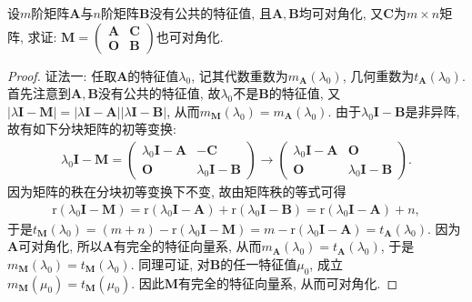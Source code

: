 \documentclass[../../main.tex]{subfiles}%
\begin{document}
\begin{proposition}\label{proposition:没有公共的特征值的可对角化矩阵的分块也可对角化}
设\(m\)阶矩阵\(\boldsymbol{A}\)与\(n\)阶矩阵\(\boldsymbol{B}\)没有公共的特征值, 且\(\boldsymbol{A},\boldsymbol{B}\)均可对角化, 又\(\boldsymbol{C}\)为\(m\times n\)矩阵, 求证: \(\boldsymbol{M} = \begin{pmatrix}
\boldsymbol{A}&\boldsymbol{C}\\
\boldsymbol{O}&\boldsymbol{B}
\end{pmatrix}\)也可对角化.
\end{proposition}
\begin{proof}

{\color{blue}证法一:}
任取\(\boldsymbol{A}\)的特征值\(\lambda_0\), 记其代数重数为\(m_{\boldsymbol{A}}(\lambda_0)\), 几何重数为\(t_{\boldsymbol{A}}(\lambda_0)\). 首先注意到\(\boldsymbol{A},\boldsymbol{B}\)没有公共的特征值, 故\(\lambda_0\)不是\(\boldsymbol{B}\)的特征值, 又\(|\lambda\boldsymbol{I} - \boldsymbol{M}| = |\lambda\boldsymbol{I} - \boldsymbol{A}||\lambda\boldsymbol{I} - \boldsymbol{B}|\), 从而\(m_{\boldsymbol{M}}(\lambda_0) = m_{\boldsymbol{A}}(\lambda_0)\). 由于\(\lambda_0\boldsymbol{I} - \boldsymbol{B}\)是非异阵, 故有如下分块矩阵的初等变换:
\begin{align*}
\lambda_0\boldsymbol{I} - \boldsymbol{M} = \begin{pmatrix}
\lambda_0\boldsymbol{I} - \boldsymbol{A}&-\boldsymbol{C}\\
\boldsymbol{O}&\lambda_0\boldsymbol{I} - \boldsymbol{B}
\end{pmatrix} \to \begin{pmatrix}
\lambda_0\boldsymbol{I} - \boldsymbol{A}&\boldsymbol{O}\\
\boldsymbol{O}&\lambda_0\boldsymbol{I} - \boldsymbol{B}
\end{pmatrix}.
\end{align*}
因为矩阵的秩在分块初等变换下不变, 故由矩阵秩的等式可得
\begin{align*}
\mathrm{r}(\lambda_0\boldsymbol{I} - \boldsymbol{M}) = \mathrm{r}(\lambda_0\boldsymbol{I} - \boldsymbol{A}) + \mathrm{r}(\lambda_0\boldsymbol{I} - \boldsymbol{B}) = \mathrm{r}(\lambda_0\boldsymbol{I} - \boldsymbol{A}) + n,
\end{align*}
于是\(t_{\boldsymbol{M}}(\lambda_0) = (m + n) - \mathrm{r}(\lambda_0\boldsymbol{I} - \boldsymbol{M}) = m - \mathrm{r}(\lambda_0\boldsymbol{I} - \boldsymbol{A}) = t_{\boldsymbol{A}}(\lambda_0)\). 因为\(\boldsymbol{A}\)可对角化, 所以\(\boldsymbol{A}\)有完全的特征向量系, 从而\(m_{\boldsymbol{A}}(\lambda_0) = t_{\boldsymbol{A}}(\lambda_0)\), 于是\(m_{\boldsymbol{M}}(\lambda_0) = t_{\boldsymbol{M}}(\lambda_0)\). 同理可证, 对\(\boldsymbol{B}\)的任一特征值\(\mu_0\), 成立\(m_{\boldsymbol{M}}(\mu_0) = t_{\boldsymbol{M}}(\mu_0)\). 因此\(\boldsymbol{M}\)有完全的特征向量系, 从而可对角化.


\end{proof}
\end{document}

